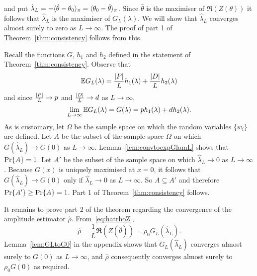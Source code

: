 \documentclass[journal]{IEEEtran}
\begin{document}
and put $\hat{\lambda}_L = -\langle \hat{\theta} - \theta_0 \rangle_\pi = \langle \theta_0 - \hat{\theta} \rangle_\pi$.  Since $\hat{\theta}$ is the maximiser of $\Re(Z(\theta))$ it follows that $\hat{\lambda}_L$ is the maximiser of $G_L(\lambda)$.  We will show that $\hat{\lambda}_L$ converges almost surely to zero as $L \rightarrow \infty$.  The proof of part 1 of Theorem~\ref{thm:consistency} follows from this.

Recall the functions $G$, $h_1$ and $h_2$ defined in the statement of Theorem~\ref{thm:consistency}.  Observe that
\[
{\mathbb E} G_L(\lambda) = \frac{{\left\vert P \right\vert}}{L} h_1(\lambda) + \frac{{\left\vert D \right\vert}}{L} h_2(\lambda)
\]
and since $\frac{{\left\vert P \right\vert}}{L} \rightarrow p$ and $\frac{{\left\vert D \right\vert}}{L} \rightarrow d$ as $L \rightarrow \infty$,
\[
\lim_{L \rightarrow\infty} {\mathbb E} G_L(\lambda) = G(\lambda) = p h_1(\lambda)   +  d h_2(\lambda).
\]
As is customary, let $\Omega$ be the sample space on which the random variables $\{w_i\}$ are defined.  Let $A$ be the subset of the sample space $\Omega$ on which $G(\hat{\lambda}_L) \rightarrow G(0)$ as $L\rightarrow\infty$.  Lemma~\ref{lem:convtoexpGlamL} shows that ${\operatorname{Pr}}\{A\} = 1$.  Let $A'$ be the subset of the sample space on which $\hat{\lambda}_L \rightarrow 0$ as $L\rightarrow \infty$.  Because $G(x)$ is uniquely maximised at $x=0$, it follows that $G(\hat{\lambda}_L) \rightarrow G(0)$ only if $\hat{\lambda}_L \rightarrow 0$ as $L \rightarrow\infty$. So $A \subseteq A'$ and therefore ${\operatorname{Pr}}\{A'\} \geq {\operatorname{Pr}}\{A\} = 1$.  Part 1 of Theorem~\ref{thm:consistency} follows.  

It remains to prove part 2 of the theorem regarding the convergence of the amplitude estimator $\hat{\rho}$.  From~\eqref{eq:hatrhoZ},
\begin{equation}\label{eq:rhoGLZ}
\hat{\rho} = \frac{1}{L}\Re(Z(\hat{\theta})) = \rho_0 G_L(\hat{\lambda}_L).
\end{equation}  
Lemma~\ref{lem:GLtoG0} in the appendix shows that $G_L(\hat{\lambda}_L)$ converges almost surely to $G(0)$ as $L\rightarrow\infty$, and $\hat{\rho}$ consequently converges almost surely to $\rho_0 G(0)$ as required.  %
\end{document}
